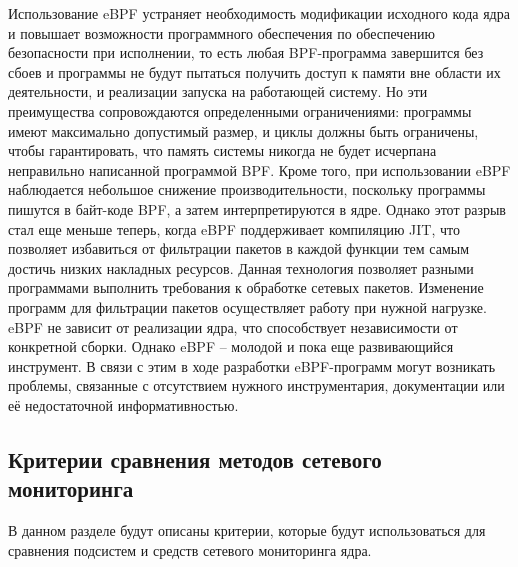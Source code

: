 Использование eBPF устраняет необходимость модификации исходного кода ядра и повышает возможности программного обеспечения по обеспечению безопасности при исполнении, то есть любая BPF-программа завершится без сбоев и программы не будут пытаться получить
доступ к памяти вне области их деятельности, и реализации запуска на работающей систему.
Но эти преимущества сопровождаются определенными ограничениями: программы имеют максимально допустимый размер, и циклы должны быть ограничены, чтобы гарантировать, что память системы никогда не будет исчерпана неправильно написанной программой BPF.
Кроме того, при использовании eBPF наблюдается небольшое снижение производительности, поскольку программы пишутся в байт-коде BPF, а затем интерпретируются в ядре. Однако этот разрыв стал еще меньше теперь, когда eBPF поддерживает компиляцию JIT, что позволяет избавиться от фильтрации пакетов в каждой функции тем самым достичь низких накладных ресурсов.
Данная технология позволяет разными программами выполнить требования к обработке сетевых пакетов.
Изменение программ для фильтрации пакетов осуществляет работу при нужной нагрузке.
eBPF не зависит от реализации ядра, что способствует независимости от конкретной сборки.
Однако eBPF – молодой и пока еще развивающийся инструмент. В связи с этим в ходе разработки eBPF-программ могут возникать проблемы, связанные с отсутствием нужного инструментария, документации или её недостаточной информативностью.

\subsection{Критерии сравнения методов сетевого мониторинга}

В данном разделе будут описаны критерии, которые будут использоваться для сравнения подсистем и средств сетевого мониторинга ядра.

